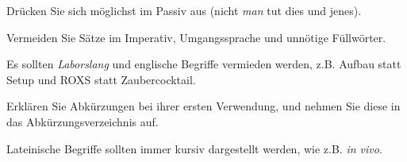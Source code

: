\begin{compactitem}
	\item Drücken Sie sich möglichst im Passiv aus (nicht \frqq\textit{man} tut dies und jenes\flqq{}).
	\item Vermeiden Sie Sätze im Imperativ, Umgangssprache und unnötige Füllwörter.
	\item Es sollten \textit{Laborslang }und englische Begriffe vermieden werden, z.B. \frqq Aufbau\flqq{} statt \frqq Setup\flqq{} und \frqq ROXS\flqq{}  statt \frqq Zaubercocktail\flqq.
	\item Erklären Sie Abkürzungen bei ihrer ersten Verwendung, und nehmen Sie diese in das Abkürzungsverzeichnis auf.
	\item Lateinische Begriffe sollten immer kursiv dargestellt werden, wie z.B. \textit{in vivo}.
\end{compactitem}